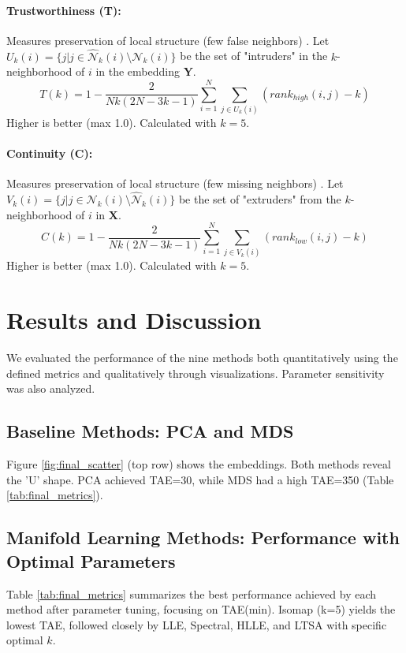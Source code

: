 \documentclass{article}
\begin{document}
\paragraph{Trustworthiness (T):} Measures preservation of local structure (few false neighbors) \citep{Venna2001}. Let $U_k(i) = \{j | j \in \hat{\mathcal{N}}_k(i) \setminus \mathcal{N}_k(i)\}$ be the set of "intruders" in the $k$-neighborhood of $i$ in the embedding $\mathbf{Y}$.
\[ T(k) = 1 - \frac{2}{Nk(2N-3k-1)} \sum_{i=1}^N \sum_{j \in U_k(i)} (rank_{high}(i, j) - k) \]
Higher is better (max 1.0). Calculated with $k=5$.

\paragraph{Continuity (C):} Measures preservation of local structure (few missing neighbors) \citep{Venna2001}. Let $V_k(i) = \{j | j \in \mathcal{N}_k(i) \setminus \hat{\mathcal{N}}_k(i)\}$ be the set of "extruders" from the $k$-neighborhood of $i$ in $\mathbf{X}$.
\[ C(k) = 1 - \frac{2}{Nk(2N-3k-1)} \sum_{i=1}^N \sum_{j \in V_k(i)} (rank_{low}(i, j) - k) \]
Higher is better (max 1.0). Calculated with $k=5$.

\section{Results and Discussion}
\label{sec:results}

We evaluated the performance of the nine methods both quantitatively using the defined metrics and qualitatively through visualizations. Parameter sensitivity was also analyzed.

\subsection{Baseline Methods: PCA and MDS}
Figure \ref{fig:final_scatter} (top row) shows the embeddings. Both methods reveal the 'U' shape. PCA achieved TAE=30, while MDS had a high TAE=350 (Table \ref{tab:final_metrics}).

\subsection{Manifold Learning Methods: Performance with Optimal Parameters}
Table \ref{tab:final_metrics} summarizes the best performance achieved by each method after parameter tuning, focusing on TAE(min). Isomap (k=5) yields the lowest TAE, followed closely by LLE, Spectral, HLLE, and LTSA with specific optimal $k$.
\end{document}
